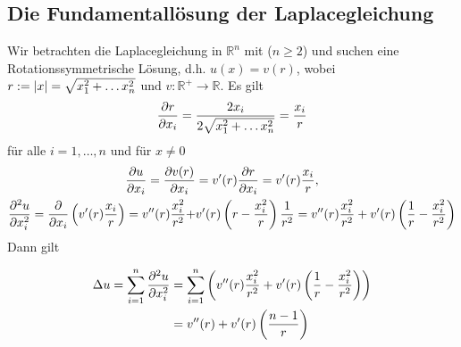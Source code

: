 \subsection{Die Fundamentallösung der Laplacegleichung} 
\label{sub:die_fundamentallosung_der_laplacegleichung}
Wir betrachten die Laplacegleichung in $\mathbb{R}^n$ mit ($n \geq 2$) und suchen eine Rotationssymmetrische Lösung, d.h. $u(x) = v(r)$, wobei $r := \lvert x\rvert= \sqrt{x_1^2 + \dots x_n^2}$ und $v : \mathbb{R}^+ \to \mathbb{R}$. Es gilt
\begin{equation}
	\frac{{\partial r}}{{\partial x_i}}  = \frac{2x_i}{2\sqrt{x_1^2 + \dots x_n^2} } = \frac{x_i}{r}
\end{equation}
für alle $i=1,\dots,n$ und für $x \neq 0$
\begin{align}
	\frac{{\partial u}}{{\partial x_i}}  = \frac{{\partial v(r)}}{{\partial x_i}}  &= v'(r) \frac{{\partial r}}{{\partial x_i}}  = v'(r) \frac{x_i}{r}, \\
	\frac{{\partial ^2u}}{{\partial x_i^2}}  = \frac{{\partial }}{{\partial x_i}}  \left( v'(r) \frac{x_i}{r} \right) = v''(r) \frac{x_i^2}{r^2} + &v'(r) \left( r - \frac{x_i^2}{r} \right) \frac{1}{r^2} = v''(r) \frac{x_i^2}{r^2} + v'(r) \left( \frac{1}{r} - \frac{x_i^2}{r^2} \right)
\end{align}
Dann gilt

\begin{align*}
	\Delta u = \sum^{n}_{i=1} \frac{{\partial ^2u}}{{\partial x_i^2}}  &= \sum^{n}_{i=1} \left( v''(r) \frac{x_i^2}{r^2} + v'(r) \left( \frac{1}{r} - \frac{x_i^2}{r^2} \right) \right) \\
	&= v''(r) + v'(r) \left( \frac{n-1}{r} \right)
\end{align*}

